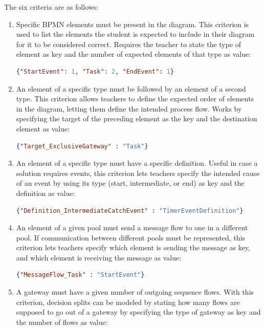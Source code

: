 The six criteria are as follows:
\begin{enumerate}
    \item Specific BPMN elements must be present in the diagram. This criterion is used to list the elements the student is expected to include in their diagram for it to be considered correct. Requires the teacher to state the type of element as key and the number of expected elements of that type as value:
    \begin{lstlisting}[language=json,firstnumber=1]
    {"StartEvent": 1, "Task": 2, "EndEvent": 1}
    \end{lstlisting}
    \item An element of a specific type must be followed by an element of a second type. This criterion allows teachers to define the expected order of elements in the diagram, letting them define the intended process flow. Works by specifying the target of the preceding element as the key and the destination element as value:
    \begin{lstlisting}[language=json,firstnumber=1]
    {"Target_ExclusiveGateway" : "Task"}
    \end{lstlisting}
    \item An element of a specific type must have a specific definition. Useful in case a solution requires events, this criterion lets teachers specify the intended cause of an event by using its type (start, intermediate, or end) as key and the definition as value:
    \begin{lstlisting}[language=json,firstnumber=1]
    {"Definition_IntermediateCatchEvent" : "TimerEventDefinition"}
    \end{lstlisting}
    \item An element of a given pool must send a message flow to one in a different pool. If communication between different pools must be represented, this criterion lets teachers specify which element is sending the message as key, and which element is receiving the message as value:
    \begin{lstlisting}[language=json,firstnumber=1]
    {"MessageFlow_Task" : "StartEvent"}
    \end{lstlisting}
    \item A gateway must have a given number of outgoing sequence flows. With this criterion, decision splits can be modeled by stating how many flows are supposed to go out of a gateway by specifying the type of gateway as key and the number of flows as value:
    \begin{lstlisting}[language=json,firstnumber=1]

\end{lstlisting}
\end{enumerate}
